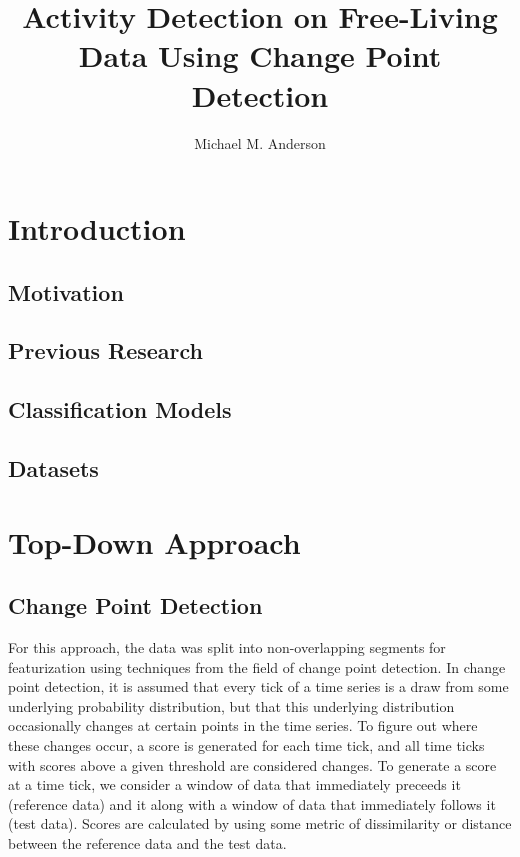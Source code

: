 \documentclass[onehalf,11pt]{beavtex}
\title{Activity Detection on Free-Living Data Using Change Point Detection}
\author{Michael M. Anderson}
\begin{document}
\maketitle
\mainmatter






\chapter{Introduction}
\section{Motivation}
\section{Previous Research}
\section{Classification Models}
\section{Datasets}




\chapter{Top-Down Approach}
\section{Change Point Detection}
For this approach, the data was split into non-overlapping segments for
featurization using techniques from the field of change point detection. 
In change point detection, it is assumed that every
tick of a time series is a draw from some underlying probability distribution,
but that this underlying distribution occasionally changes at certain 
points in the time series. To figure out where these
changes occur, a score is generated for each time tick, and all time ticks with
scores above a given threshold are considered changes. To generate a score at
a time tick, we consider a window of data that immediately preceeds it
(reference data) and it along with a window of data that immediately follows it (test data).
Scores are calculated by using some metric of dissimilarity or distance
between the reference data and the test data.
\end{document}
